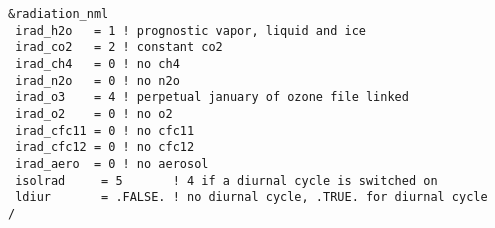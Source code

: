 \begin{lstlisting}[caption=Radiation namelist {\tt radiation\_nml} for
  RCE in {\tt exp.atm\_rce\_test}, label=cr20160614_radiation_nml]
&radiation_nml
 irad_h2o   = 1 ! prognostic vapor, liquid and ice
 irad_co2   = 2 ! constant co2
 irad_ch4   = 0 ! no ch4
 irad_n2o   = 0 ! no n2o
 irad_o3    = 4 ! perpetual january of ozone file linked
 irad_o2    = 0 ! no o2
 irad_cfc11 = 0 ! no cfc11
 irad_cfc12 = 0 ! no cfc12
 irad_aero  = 0 ! no aerosol
 isolrad     = 5       ! 4 if a diurnal cycle is switched on
 ldiur       = .FALSE. ! no diurnal cycle, .TRUE. for diurnal cycle
/
\end{lstlisting}


